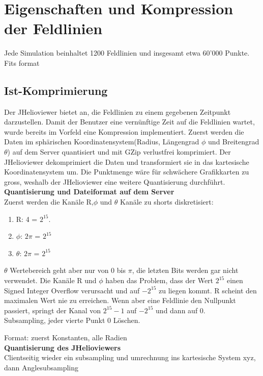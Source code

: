 \section{Eigenschaften und Kompression der Feldlinien}
Jede Simulation beinhaltet 1200 Feldlinien und insgesamt etwa 60'000 Punkte. Fits format \cite{website:fits}

\subsection{Ist-Komprimierung} \label{konzept:ist-komprimierung}
Der JHelioviewer bietet an, die Feldlinien zu einem gegebenen Zeitpunkt darzustellen. Damit der Benutzer eine vernünftige Zeit auf die Feldlinien wartet, wurde bereits im Vorfeld eine Kompression implementiert. Zuerst werden die Daten im sphärischen Koordinatensystem(Radius, Längengrad $\phi$ und Breitengrad $\theta$) auf dem Server quantisiert und mit GZip verlustfrei komprimiert. Der JHelioviewer dekomprimiert die Daten und transformiert sie in das kartesische Koordinatensystem um. Die Punktmenge wäre für schwächere Grafikkarten zu gross, weshalb der JHelioviewer eine weitere Quantisierung durchführt.\\
[\baselineskip]
\textbf{Quantisierung und Dateiformat auf dem Server}\\
Zuerst werden die Kanäle R,$\phi$ und $\theta$ Kanäle zu shorts diskretisiert:
\begin{enumerate}
 \item R: 4 = $2^{15}$. 
 \item $\phi$: $2\pi$ = $2^{15}$
 \item $\theta$: $2\pi$ = $2^{15}$
\end{enumerate}
$\theta$ Wertebereich geht aber nur von 0 bis $\pi$, die letzten Bits werden gar nicht verwendet. Die Kanäle R und $\phi$ haben das Problem, dass der Wert $2^{15}$ einen Signed Integer Overflow verursacht und auf $-2^{15}$ zu liegen kommt. R scheint den maximalen Wert nie zu erreichen. Wenn aber eine Feldlinie den Nullpunkt passiert, springt der Kanal von  $2^{15}-1$ auf $-2^{15}$ und dann auf 0.\\
[\baselineskip]
Subsampling, jeder vierte Punkt 
0 Löschen.

Format: zuerst Konstanten, alle Radien\\
[\baselineskip]
\textbf{Quantisierung des JHelioviewers}\\
Clientseitig wieder ein subsampling und umrechnung ins kartesische System xyz, dann Anglesubsampling
	
